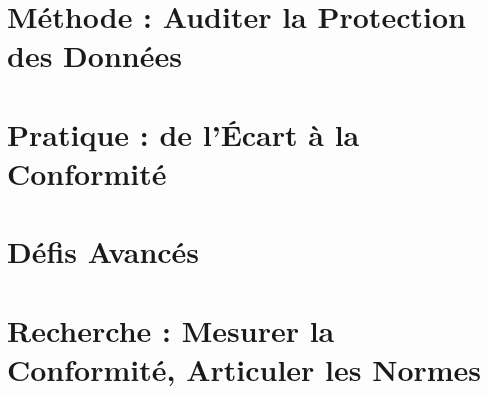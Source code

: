\documentclass[12pt, twoside, openright, a4paper]{book}
\begin{document}
        
        

    \part{Méthode : Auditer la Protection des Données}
    \label{part:methode}

        
        
        
        
        

    \part{Pratique : de l'Écart à la Conformité}
    \label{part:pratique}

        
        
        
        

    \part{Défis Avancés}
    \label{part:defis}

        
        

    \part{Recherche : Mesurer la Conformité, Articuler les Normes}
    \label{part:recherche}

        

\appendix

    
    
    
    
    
    
    

\backmatter
\end{document}
